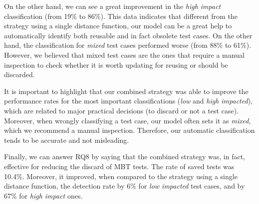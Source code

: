 On the other hand, we can see a great improvement in the \textit{high impact} classification (from 19\% to 86\%). This data indicates that different from the strategy using a single distance function, our model can be a great help to automatically identify both reusable and in fact obsolete test cases. On the other hand, the classification for \textit{mixed} test cases performed worse (from 88\% to 61\%). However, we believed that mixed test cases are the ones that require a manual inspection to check whether it is worth updating for reusing or should be discarded. 

It is important to highlight that our combined strategy was able to improve the performance rates for the most important classifications (\textit{low} and \textit{high impacted}), which are related to major practical decisions (to discard or not a test case). Moreover, when wrongly classifying a test case, our model often sets it as \textit{mixed}, which we recommend a manual inspection. Therefore, our automatic classification tends to be accurate and not misleading. 

Finally, we can answer RQ8 by saying that the combined strategy was, in fact, effective for reducing the discard of MBT tests. The rate of saved tests was 10.4\%. Moreover, it improved, when compared to the strategy using a single distance function, the detection rate by 6\% for \textit{low impacted} test cases, and by 67\% for \textit{high impact} ones. 
\\
\\
\noindent
\vspace{2mm} %
\vspace{2mm}




